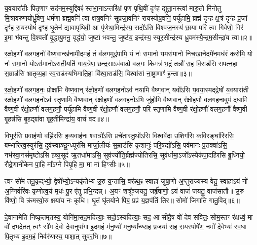 य॒वयारा॑तीः पितृ॒णाꣳ सद॑नम॒स्युद्दिवꣴ॑ स्तभा॒ना\-ऽन्तरि॑क्षं पृण पृथि॒वीं दृꣳ॑ह द्युता॒नस्त्वा॑ मारु॒तो मि॑नोतु मि॒त्रावरु॑णयोर्ध्रु॒वेण॒ धर्म॑णा ब्रह्म॒वनिं॑ त्वा क्षत्र॒वनिꣳ॑ सुप्रजा॒वनिꣳ॑ रायस्पोष॒वनिं॒ पर्यू॑हामि॒ ब्रह्म॑ दृꣳह क्ष॒त्रं दृꣳ॑ह प्र॒जां दृꣳ॑ह रा॒यस्पोषं॑ दृꣳह घृ॒तेन॑ द्यावापृथिवी॒ आ पृ॑णेथा॒मिन्द्र॑स्य॒ सदो॑\-ऽसि विश्वज॒नस्य॑ छा॒या परि॑ त्वा गिर्वणो॒ गिर॑ इ॒मा भ॑वन्तु वि॒श्वतो॑ वृ॒द्धायु॒मनु॒ वृद्ध॑यो॒ जुष्टा॑ भवन्तु॒ जुष्ट॑य॒ इन्द्र॑स्य॒ स्यूर॒सीन्द्र॑स्य ध्रु॒वम॑स्यै॒न्द्रम॒सीन्द्रा॑य त्वा॥२॥

{\anuvakamend[{द्वेष॑ इ॒मा अ॒ष्टाद॑श च॥१॥}]}

र॒क्षो॒हणो॑ वलग॒हनो॑ वैष्ण॒वान्ख॑नामी॒दम॒हं तं व॑ल॒गमुद्व॑पामि॒ यं नः॑ समा॒नो यमस॑मानो निच॒खाने॒दमे॑न॒मध॑रं करोमि॒ यो नः॑ समा॒नो यो\-ऽस॑मानो\-ऽराती॒यति॑ गाय॒त्रेण॒ छन्द॒सा\-ऽव॑बाढो वल॒गः किमत्र॑ भ॒द्रं तन्नौ॑ स॒ह वि॒राड॑सि सपत्न॒हा स॒म्राड॑सि भ्रातृव्य॒हा स्व॒राड॑स्यभिमाति॒हा वि॑श्वा॒राड॑सि॒ विश्वा॑सां ना॒ष्ट्राणाꣳ॑ ह॒न्ता॥३॥

र॒क्षो॒हणो॑ वलग॒हनः॒ प्रोक्षा॑मि वैष्ण॒वान् र॑क्षो॒हणो॑ वलग॒हनो\-ऽव॑ नयामि वैष्ण॒वान् यवो॑\-ऽसि य॒वया॒स्मद्द्वेषो॑ य॒वयारा॑ती रक्षो॒हणो॑ वलग॒हनो\-ऽव॑ स्तृणामि वैष्ण॒वान् र॑क्षो॒हणो॑ वलग॒हनो॒\-ऽभि जु॑होमि वैष्ण॒वान् र॑क्षो॒हणौ॑ वलग॒हना॒वुप॑ दधामि वैष्ण॒वी र॑क्षो॒हणौ॑ वलग॒हनौ॒ पर्यू॑हामि वैष्ण॒वी र॑क्षो॒हणौ॑ वलग॒हनौ॒ परि॑ स्तृणामि वैष्ण॒वी र॑क्षो॒हणौ॑ वलग॒हनौ॑ वैष्ण॒वी बृ॒हन्न॑सि बृ॒हद्ग्रा॑वा बृह॒तीमिन्द्रा॑य॒ वाचं॑ वद॥४॥

{\anuvakamend[{ह॒न्तेन्द्रा॑य॒ द्वे च॑॥२॥}]}

वि॒भूर॑सि प्र॒वाह॑णो॒ वह्नि॑रसि हव्य॒वाह॑नः श्वा॒त्रो॑\-ऽसि॒ प्रचे॑तास्तु॒थो॑\-ऽसि वि॒श्ववे॑दा उ॒शिग॑सि क॒विरङ्घा॑रिरसि॒ बम्भा॑रिरव॒स्युर॑सि॒ दुव॑स्वाञ्छु॒न्ध्यूर॑सि मार्जा॒लीयः॑ स॒म्राड॑सि कृ॒शानुः॑ परि॒षद्यो॑\-ऽसि॒ पव॑मानः प्र॒तक्वा॑\-ऽसि॒ नभ॑स्वा॒नसं॑मृष्टो\-ऽसि हव्य॒सूद॑ ऋ॒तधा॑मा\-ऽसि॒ सुव॑र्ज्योति॒र्ब्रह्म॑ज्योतिरसि॒ सुव॑र्धामा॒\-ऽजो᳚\-ऽस्येक॑पा॒दहि॑रसि बु॒ध्नियो॒ रौद्रे॒णानी॑केन पा॒हि मा᳚\-ऽग्ने पिपृ॒हि मा॒ मा मा॑ हिꣳसीः॥५॥

{\anuvakamend[{अनी॑केना॒ष्टौ च॑॥३॥}]}

त्वꣳ सो॑म तनू॒कृद्भ्यो॒ द्वेषो᳚भ्यो॒\-ऽन्यकृ॑तेभ्य उ॒रु य॒न्तासि॒ वरू॑थ॒ꣴ॒ स्वाहा॑ जुषा॒णो अ॒प्तुराज्य॑स्य वेतु॒ स्वाहा॒\-ऽयं नो॑ अ॒ग्निर्वरि॑वः कृणोत्व॒यं मृधः॑ पु॒र ए॑तु प्रभि॒न्दन्न्। अ॒यꣳ शत्रू᳚ञ्जयतु॒ जर्हृ॑षाणो॒ \-ऽयं वाजं॑ जयतु॒ वाज॑सातौ॥ उ॒रु वि॑ष्णो॒ वि क्र॑मस्वो॒रु क्षया॑य नः कृधि। घृ॒तं घृ॑तयोने पिब॒ प्रप्र॑ य॒ज्ञप॑तिं तिर॥ सोमो॑ जिगाति गातु॒विद्॥६॥

दे॒वाना॑मेति निष्कृ॒तमृ॒तस्य॒ योनि॑मा॒सद॒मदि॑त्याः॒ सदो॒\-ऽस्यदि॑त्याः॒ सद॒ आ सी॑दै॒ष वो॑ देव सवितः॒ सोम॒स्तꣳ र॑क्षध्वं॒ मा वो॑ दभदे॒तत् त्वꣳ सो॑म दे॒वो दे॒वानुपा॑गा इ॒दम॒हं म॑नु॒ष्यो॑ मनु॒ष्या᳚न्थ्स॒ह प्र॒जया॑ स॒ह रा॒यस्पोषे॑ण॒ नमो॑ दे॒वेभ्यः॑ स्व॒धा पि॒तृभ्य॑ इ॒दम॒हं निर्वरु॑णस्य॒ पाशा॒त् सुव॑र॒भि॥७॥

